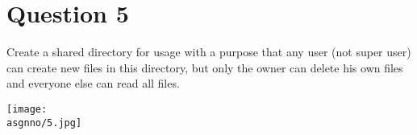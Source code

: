 \documentclass[main.tex]{subfiles}
\begin{document}
\section{Question 5}

Create a shared directory for usage with a purpose that any user (not super
user) can create new files in this directory, but only the owner can delete his
own files and everyone else can read all files.


\centering\texttt{[image: \\asgnno/5.jpg]}
\end{document}
